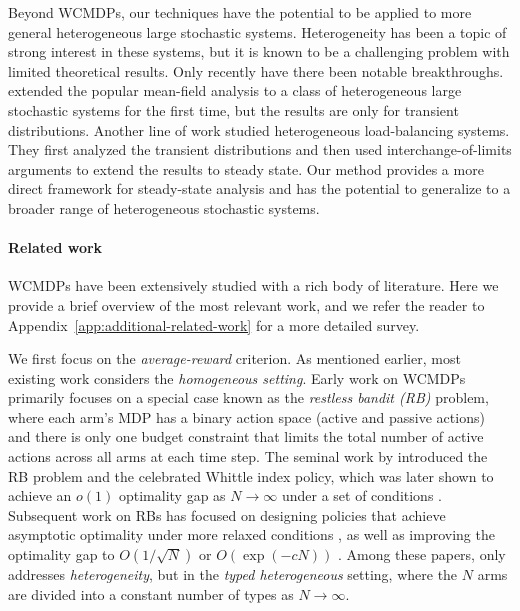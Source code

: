 \documentclass[11pt,letterpaper]{article}
\begin{document}
Beyond WCMDPs, our techniques have the potential to be applied to more general heterogeneous large stochastic systems.
Heterogeneity has been a topic of strong interest in these systems, but it is known to be a challenging problem with limited theoretical results.
Only recently have there been notable breakthroughs.
\citep{AllGas22_het,AllGas22_graphon} extended the popular mean-field analysis to a class of heterogeneous large stochastic systems for the first time, but the results are only for transient distributions.
Another line of work \citep{ZhaMukWu_24_data_loc_het,ZhaMuk_24_rate_mat_prun} studied heterogeneous load-balancing systems.
They first analyzed the transient distributions and then used interchange-of-limits arguments to extend the results to steady state.
Our method provides a more direct framework for steady-state analysis and has the potential to generalize to a broader range of heterogeneous stochastic systems.


\paragraph{Related work}
WCMDPs have been extensively studied with a rich body of literature.
Here we provide a brief overview of the most relevant work, and we refer the reader to Appendix~\ref{app:additional-related-work} for a more detailed survey.

We first focus on the \emph{average-reward} criterion.
As mentioned earlier, most existing work considers the \emph{homogeneous setting}.
Early work on WCMDPs primarily focuses on a special case known as the \emph{restless bandit (RB)} problem, where each arm's MDP has a binary action space (active and passive actions) and there is only one budget constraint that limits the total number of active actions across all arms at each time step.
The seminal work by \citet{Whi_88_rb} introduced the RB problem and the celebrated Whittle index policy, which was later shown to achieve an $o(1)$ optimality gap as $N\to\infty$ under a set of conditions \citep{WebWei_90}.
Subsequent work on RBs has focused on designing policies that achieve asymptotic optimality under more relaxed conditions \citep{Ver_16_verloop,HonXieChe_23,HonXieChe_24,Yan_24}, as well as improving the optimality gap to $O(1/\sqrt{N})$ \citep{HonXieChe_23,HonXieChe_24} or $O(\exp(-cN))$ \citep{GasGauYan_23_exponential,GasGauYan_23_whittles,hong2024exponential}.
Among these papers, only \citep{Ver_16_verloop} addresses \emph{heterogeneity}, but in the \emph{typed heterogeneous} setting, where the $N$ arms are divided into a constant number of types as $N\to\infty$.
\end{document}
